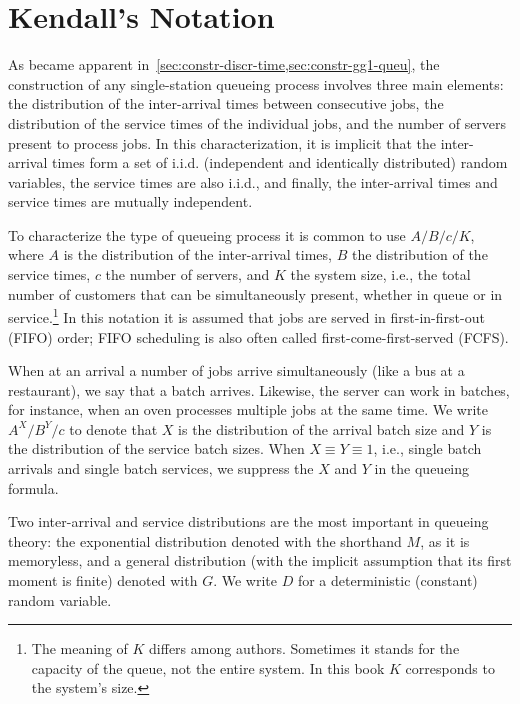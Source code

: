 \section{Kendall's Notation}
\label{sec:kendalls-notation}





As became apparent in~\cref{sec:constr-discr-time,sec:constr-gg1-queu}, the construction of any single-station queueing process involves three main elements: the distribution of the inter-arrival times between consecutive jobs, the distribution of the service times of the individual jobs, and the number of servers present to process jobs.
In this characterization, it is implicit that the inter-arrival times form a set of i.i.d.
(independent and identically distributed) random variables, the service times are also i.i.d., and finally, the inter-arrival times and service times are mutually independent.

To characterize the type of queueing process it is common to use 
 $A/B/c/K$, where $A$ is the distribution of the
inter-arrival times, $B$ the distribution of the service times, $c$ the
number of servers, and $K$ the system size, i.e., the total number of customers that can be simultaneously present, whether in queue or in service.\footnote{The meaning of $K$ differs among authors. Sometimes it stands for
 the capacity of the queue, not the entire system. In this book $K$ corresponds to the system's size.}
In this notation it is assumed that jobs are served in
first-in-first-out (FIFO) order; FIFO scheduling is also often called
first-come-first-served (FCFS). 

When at an arrival a number of jobs arrive simultaneously (like a bus at a restaurant), we say that a batch arrives.
Likewise, the server can work in batches, for instance, when an oven processes multiple jobs at the same time.
We write $A^X/B^Y/c$ to denote that $X$ is the distribution of the arrival batch size and $Y$ is the distribution of the service batch sizes.
When $X\equiv Y \equiv 1$, i.e., single batch arrivals and single batch services, we suppress the $X$ and $Y$ in the queueing formula.


Two inter-arrival and service distributions are the most important in queueing theory: the exponential distribution denoted with the shorthand $M$, as it is memoryless, and a general distribution (with the implicit assumption that its first moment is finite) denoted with $G$. We write $D$ for a deterministic (constant) random variable. 

